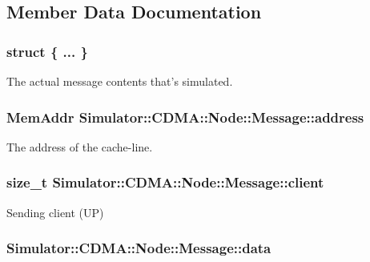 \subsection{Member Data Documentation}
\hypertarget{union_simulator_1_1_c_d_m_a_1_1_node_1_1_message_a7304d09679793225172d2abdec4b9e73}{\subsubsection[{"@60}]{\setlength{\rightskip}{0pt plus 5cm}struct \{ ... \} }}\label{union_simulator_1_1_c_d_m_a_1_1_node_1_1_message_a7304d09679793225172d2abdec4b9e73}


The actual message contents that's simulated. 

\hypertarget{union_simulator_1_1_c_d_m_a_1_1_node_1_1_message_a49e22738904eeee4d3daeef53cff7671}{
\subsubsection[{address}]{\setlength{\rightskip}{0pt plus 5cm}Mem\+Addr Simulator\+::\+C\+D\+M\+A\+::\+Node\+::\+Message\+::address}}\label{union_simulator_1_1_c_d_m_a_1_1_node_1_1_message_a49e22738904eeee4d3daeef53cff7671}


The address of the cache-\/line. 

\hypertarget{union_simulator_1_1_c_d_m_a_1_1_node_1_1_message_a69e5d008aa2f5e5ba4a4858313b8c43e}{
\subsubsection[{client}]{\setlength{\rightskip}{0pt plus 5cm}size\+\_\+t Simulator\+::\+C\+D\+M\+A\+::\+Node\+::\+Message\+::client}}\label{union_simulator_1_1_c_d_m_a_1_1_node_1_1_message_a69e5d008aa2f5e5ba4a4858313b8c43e}


Sending client (U\+P) 

\hypertarget{union_simulator_1_1_c_d_m_a_1_1_node_1_1_message_aa245e95fda405759ee6e9ba5336a24b5}{
\subsubsection[{data}]{ Simulator\+::\+C\+D\+M\+A\+::\+Node\+::\+Message\+::data}}\label{union_simulator_1_1_c_d_m_a_1_1_node_1_1_message_aa245e95fda405759ee6e9ba5336a24b5}


